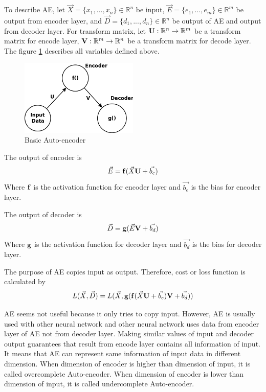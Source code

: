 \documentclass[draft,dvipsnames]{drexel-thesis}
\begin{document}
\begin{thesis}
\begin{enumerate}
To describe AE, let $\vec{X} = \{x_1, ..., x_n\} \in \mathbb{R}^n$ be input, $\vec{E} = \{e_1, ..., e_m\} \in \mathbb{R}^m$ be output from encoder layer, and $\vec{D} = \{d_1, ..., d_n\} \in \mathbb{R}^n$ be output of AE and output from decoder layer. For transform matrix, let $\bold{U}: \mathbb{R}^n \rightarrow \mathbb{R}^m$ be a transform matrix for encode layer, $\bold{V}: \mathbb{R}^m \rightarrow \mathbb{R}^n$ be a transform matrix for decode layer. The figure \ref{fig:basic_AE} describes all variables defined above.

\begin{figure}[t!]
    \centering
    \includegraphics[width=0.5\textwidth]{pictures/figures/basic_AE.png}
    \caption{Basic Auto-encoder}
    \label{fig:basic_AE}
\end{figure}

The output of encoder is
$$\vec{E} = \bold{f}(\vec{X}\bold{U}+\vec{b_e})$$
Where $\bold{f}$ is the activation function for encoder layer and $\vec{b_e}$ is the bias for encoder layer.

The output of decoder is
$$\vec{D} = \bold{g}(\vec{E}\bold{V}+\vec{b_d})$$
Where $\bold{g}$ is the activation function for decoder layer and $\vec{b_d}$ is the bias for decoder layer.

The purpose of AE copies input as output. Therefore, cost or loss function is calculated by
$$L(\vec{X}, \vec{D}) = L(\vec{X}, \bold{g}(\bold{f}(\vec{X}\bold{U}+\vec{b_e})\bold{V}+\vec{b_d}))$$

AE seems not useful because it only tries to copy input. However, AE is usually used with other neural network and other neural network uses data from encoder layer of AE not from decoder layer. Making similar values of input and decoder output guarantees that result from encode layer contains all information of input. It means that AE can represent same information of input data in different dimension. When dimension of encoder is higher than dimension of input, it is called overcomplete Auto-encoder. When dimension of encoder is lower than dimension of input, it is called undercomplete Auto-encoder.


\end{enumerate}
\end{thesis}
\end{document}
